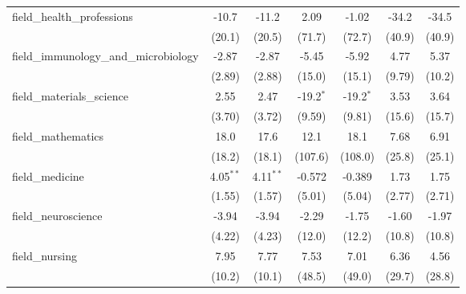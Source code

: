 \begin{tabular}{lcccccc}
   field\_health\_professions                                  & -10.7        & -11.2         & 2.09          & -1.02          & -34.2          & -34.5\\   
                                                               & (20.1)       & (20.5)        & (71.7)        & (72.7)         & (40.9)         & (40.9)\\   
   field\_immunology\_and\_microbiology                        & -2.87        & -2.87         & -5.45         & -5.92          & 4.77           & 5.37\\   
                                                               & (2.89)       & (2.88)        & (15.0)        & (15.1)         & (9.79)         & (10.2)\\   
   field\_materials\_science                                   & 2.55         & 2.47          & -19.2$^{*}$   & -19.2$^{*}$    & 3.53           & 3.64\\   
                                                               & (3.70)       & (3.72)        & (9.59)        & (9.81)         & (15.6)         & (15.7)\\   
   field\_mathematics                                          & 18.0         & 17.6          & 12.1          & 18.1           & 7.68           & 6.91\\   
                                                               & (18.2)       & (18.1)        & (107.6)       & (108.0)        & (25.8)         & (25.1)\\   
   field\_medicine                                             & 4.05$^{**}$  & 4.11$^{**}$   & -0.572        & -0.389         & 1.73           & 1.75\\   
                                                               & (1.55)       & (1.57)        & (5.01)        & (5.04)         & (2.77)         & (2.71)\\   
   field\_neuroscience                                         & -3.94        & -3.94         & -2.29         & -1.75          & -1.60          & -1.97\\   
                                                               & (4.22)       & (4.23)        & (12.0)        & (12.2)         & (10.8)         & (10.8)\\   
   field\_nursing                                              & 7.95         & 7.77          & 7.53          & 7.01           & 6.36           & 4.56\\   
                                                               & (10.2)       & (10.1)        & (48.5)        & (49.0)         & (29.7)         & (28.8)\\   

\end{tabular}
